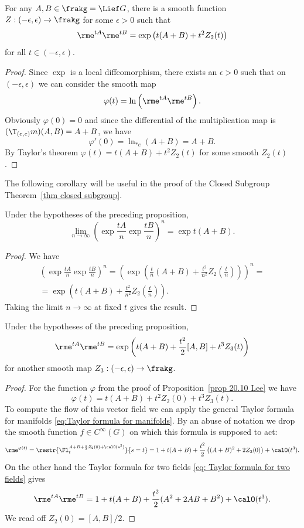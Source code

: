 \begin{prop}\label{prop 20.10 Lee}
    For any $A,B\in\frakg=\Lief G$, there is a smooth function $Z:(-\epsilon,\epsilon)\to \frakg$ for some $\epsilon>0$ such that
    \[\rme^{tA}\rme^{tB}=\exp\left(t(A+B)+t^2Z_2(t)\right)\]
    for all $t\in(-\epsilon,\epsilon)$.
\end{prop}
\begin{proof}
    Since $\exp$ is a local diffeomorphism, there exists an $\epsilon>0$ such that on $(-\epsilon,\epsilon)$ we can consider the smooth map
    \[\varphi(t)=\ln\left(\rme^{tA}\rme^{tB}\right).\]
    Obviously $\varphi(0)=0$ and since the differential of the multiplication map is $(\T_{(e,e)}m)(A,B)=A+B$, we have
    \[\varphi'(0)=\ln_{\ast e}(A+B)=A+B.\]
    By Taylor's theorem $\varphi(t)=t(A+B)+t^2Z_2(t)$ for some smooth $Z_2(t)$.
\end{proof}
The following corollary will be useful in the proof of the Closed Subgroup Theorem~\ref{thm closed subgroup}.
\begin{cor}\label{cor 20.11 Lee}
    Under the hypotheses of the preceding proposition,
    \[\lim_{n\to\infty}\left(\exp \frac{tA}{n}\exp \frac{tB}{n}\right)^n=\exp t(A+B).\]
\end{cor}
\begin{proof}
    We have 
    \begin{multline}
        \left(\exp \frac{tA}{n}\exp \frac{tB}{n}\right)^n=\left(\exp\left(\frac{t}{n}(A+B)+\frac{t^2}{n^2}Z_2\left(\frac{t}{n}\right)\right)\right)^n=\\
        =\exp\left(t(A+B)+\frac{t^2}{n^2}Z_2\left(\frac tn\right)\right).
    \end{multline}
    Taking the limit $n\to\infty$ at fixed $t$ gives the result.
\end{proof}

\begin{prop}
    Under the hypotheses of the preceding proposition, 
    \[\rme^{tA}\rme^{tB}=\exp\left(t(A+B)+\frac{t^2}{2}[A,B]+t^3Z_3(t)\right)\]
    for another smooth map $Z_3:(-\epsilon,\epsilon)\to \frakg$.
\end{prop}
\begin{proof}
    For the function $\varphi$ from the proof of Proposition~\ref{prop 20.10 Lee} we have
    \[\varphi(t)=t(A+B)+t^2Z_2(0)+t^3Z_3(t).\]
    To compute the flow of this vector field we can apply the general Taylor formula for manifolds \eqref{eq:Taylor formula for manifolds}. By an abuse of notation we drop the smooth function $f\in C^\infty(G)$ on which this formula is supposed to act:
    \[\rme^{\varphi(t)}=\restr{\Fl^{A+B+\frac{s}{2}Z_2(0)+\calO(s^2)}_t}{s=t}=1+t(A+B)+\frac{t^2}{2}\left((A+B)^2+2Z_2(0)\right)+\calO(t^3).\]
    On the other hand the Taylor formula for two fields \eqref{eq: Taylor formula for two fields} gives
    \[\rme^{tA}\rme^{tB}=1+t(A+B)+\frac{t^2}{2}(A^2+2AB+B^2)+\calO(t^3).\]
    We read off $Z_2(0)=[A,B]/2$.
\end{proof}

